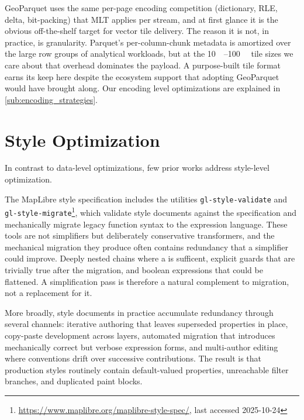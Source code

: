GeoParquet uses the same per-page encoding competition (dictionary, \ac{RLE}, delta, bit-packing) that \ac{MLT} applies per stream, and at first glance it is the obvious off-the-shelf target for vector tile delivery.
The reason it is not, in practice, is granularity.
Parquet's per-column-chunk metadata is amortized over the large row groups of analytical workloads, but at the \qtyrange{10}{100}{\kilo\byte} tile sizes we care about that overhead dominates the payload.
A purpose-built tile format earns its keep here despite the ecosystem support that adopting GeoParquet would have brought along.
Our encoding level optimizations are explained in \cref{sub:encoding_strategies}.

\section{Style Optimization}\label{sec:rw_style_optimizations}

In contrast to data-level optimizations, few prior works address style-level optimization.

\begin{sloppypar}
The MapLibre style specification includes the utilities \texttt{gl\allowbreak-style\allowbreak-validate} and \texttt{gl\allowbreak-style\allowbreak-migrate}\footnote{\url{https://www.maplibre.org/maplibre-style-spec/}, last accessed 2025-10-24}, which validate style documents against the specification and mechanically migrate legacy function syntax to the expression language.
These tools are not simplifiers but deliberately conservative transformers, and the mechanical migration they produce often contains redundancy that a simplifier could improve.
Deeply nested  chains where a  is sufficent, explicit  guards that are trivially true after the migration, and boolean expressions that could be flattened.
A simplification pass is therefore a natural complement to migration, not a replacement for it.
\end{sloppypar}

More broadly, style documents in practice accumulate redundancy through several channels: iterative authoring that leaves superseded properties in place, copy-paste development across layers, automated migration that introduces mechanically correct but verbose expression forms, and multi-author editing where conventions drift over successive contributions.
The result is that production styles routinely contain default-valued properties, unreachable filter branches, and duplicated paint blocks.

